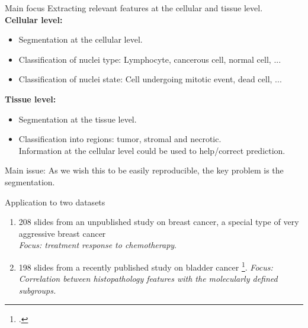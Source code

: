 \documentclass{beamer}
\begin{document}
\begin{frame}{Main focus}
 Extracting relevant features at the cellular and tissue
level. \\
\textbf{Cellular level:}
\begin{itemize}
\item Segmentation at the cellular level. 
\item Classification of nuclei type: Lymphocyte, cancerous cell, normal cell, ...
\item Classification of nuclei state: Cell undergoing mitotic event, dead cell, ...
\end{itemize}

\textbf{Tissue level:}
\begin{itemize}
\item Segmentation at the tissue level.
\item Classification into regions: tumor,
stromal and necrotic. \\
Information at the cellular level could be used to help/correct prediction.
\end{itemize}

Main issue: As we wish this to be easily reproducible, the key problem is the segmentation.
\end{frame}

\begin{frame}{Application to two datasets}
\begin{enumerate}
\item 208 slides from an unpublished study on breast
cancer, a special type of very aggressive breast cancer  \\
\emph{Focus: treatment response to chemotherapy}.
\item 198
slides from a recently published study on bladder cancer \footcite{biton2014independent}.
\emph{Focus: Correlation between histopathology features with the
molecularly defined subgroups.}
\end{enumerate}
\end{frame} 
\end{document}

